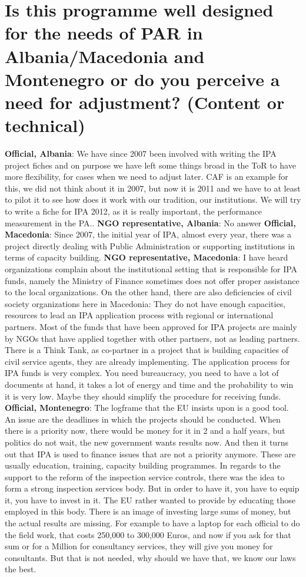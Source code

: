 \section{Is this programme well designed for the needs of PAR in Albania/Macedonia and Montenegro or do you perceive a need for adjustment? (Content or technical)}
\textbf{Official, Albania}: We have since 2007 been involved with writing the IPA project fiches and on purpose we have left some things broad in the ToR to have more flexibility, for cases when we need to adjust later. CAF is an example for this, we did not think about it in 2007, but now it is 2011 and we have to at least to pilot it to see how does it work with our tradition, our institutions. We will try to write a fiche for IPA 2012, as it is really important, the performance measurement in the PA..
\textbf{NGO representative, Albania}: No answer
\textbf{Official, Macedonia}: Since 2007, the initial year of IPA, almost every year, there was a project directly dealing with Public Administration or supporting institutions in terms of capacity building.
\textbf{NGO representative, Macedonia}: I have heard organizations complain about the institutional setting that is responsible for IPA funds, namely the Ministry of Finance sometimes does not offer proper assistance to the local organizations. On the other hand, there are also deficiencies of civil society organizations here in Macedonia: They do not have enough capacities, resources to lead an IPA application process with regional or international partners. Most of the funds that have been approved for IPA projects are mainly by NGOs that have applied together with other partners, not as leading partners. There is a Think Tank, as co-partner in a project that is building capacities of civil service agents, they are already implementing. The application process for IPA funds is very complex. You need bureaucracy, you need to have a lot of documents at hand, it takes a lot of energy and time and the probability to win it is very low. Maybe they should simplify the procedure for receiving funds.
\textbf{Official, Montenegro}: The logframe that the EU insists upon is a good tool. An issue are the deadlines in which the projects should be conducted. When there is a priority now, there would be money for it in 2 and a half years, but politics do not wait, the new government wants results now. And then it turns out that IPA is used to finance issues that are not a priority anymore. These are usually education, training, capacity building programmes. In regards to the support to the reform of the inspection service controls, there was the idea to form a strong inspection services body. But in order to have it, you have to equip it, you have to invest in it. The EU rather wanted to provide by educating those employed in this body. There is an image of investing large sums of money, but the actual results are missing. For example to have a laptop for each official to do the field work, that costs 250,000 to 300,000 Euros, and now if you ask for that sum or for a Million for consultancy services, they will give you money for consultants. But that is not needed, why should we have that, we know our laws the best.
